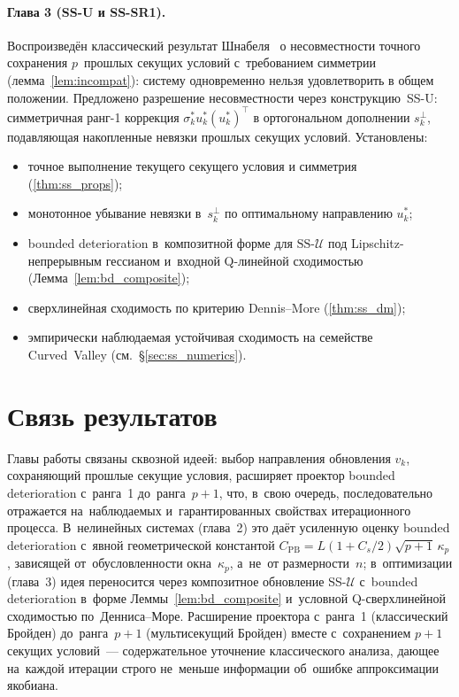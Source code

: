 \paragraph{Глава 3 (SS-U и SS-SR1).}
Воспроизведён классический результат Шнабеля~\cite{schnabel1983}
о несовместности точного сохранения $p$~прошлых секущих условий
с~требованием симметрии (лемма~\ref{lem:incompat}): систему
одновременно нельзя удовлетворить в общем положении.
Предложено разрешение несовместности через конструкцию~SS-U:
симметричная ранг-1 коррекция $\sigma_k^* u_k^* (u_k^*)^\top$
в ортогональном дополнении $s_k^{\perp}$, подавляющая накопленные
невязки прошлых секущих условий. Установлены:
\begin{itemize}[leftmargin=*]
  \item точное выполнение текущего секущего условия и симметрия
        (\ref{thm:ss_props});
  \item монотонное убывание невязки в~$s_k^{\perp}$ по оптимальному
        направлению $u_k^*$;
  \item bounded deterioration в~композитной форме для $\mathrm{SS}\text{-}\mathcal{U}$
        под Lipschitz-непрерывным гессианом и~входной Q-линейной
        сходимостью (Лемма~\ref{lem:bd_composite});
  \item сверхлинейная сходимость по критерию Dennis--More
        (\ref{thm:ss_dm});
  \item эмпирически наблюдаемая устойчивая сходимость на семействе
        Curved~Valley (см.~\S\ref{sec:ss_numerics}).
\end{itemize}

\section*{Связь результатов}

Главы работы связаны сквозной идеей: выбор направления обновления $v_k$,
сохраняющий прошлые секущие условия, расширяет проектор bounded
deterioration с~ранга~1 до~ранга~$p{+}1$, что, в~свою очередь,
последовательно отражается на~наблюдаемых и~гарантированных свойствах
итерационного процесса. В~нелинейных системах (глава~2) это даёт
усиленную оценку bounded deterioration с~явной геометрической константой
$C_{\mathrm{PB}} = L(1{+}C_s/2)\sqrt{p+1}\,\kappa_p$, зависящей
от~обусловленности окна~$\kappa_p$, а~не~от размерности~$n$;
в~оптимизации (глава~3) идея переносится через композитное обновление
SS-$\mathcal{U}$ с~bounded deterioration в~форме Леммы~\ref{lem:bd_composite}
и~условной Q-сверхлинейной сходимостью по~Денниса--Море. Расширение
проектора с~ранга~1 (классический Бройден) до~ранга~$p{+}1$
(мультисекущий Бройден) вместе с~сохранением $p{+}1$ секущих условий~---
содержательное уточнение классического анализа, дающее на~каждой
итерации строго не~меньше информации об~ошибке аппроксимации якобиана.

